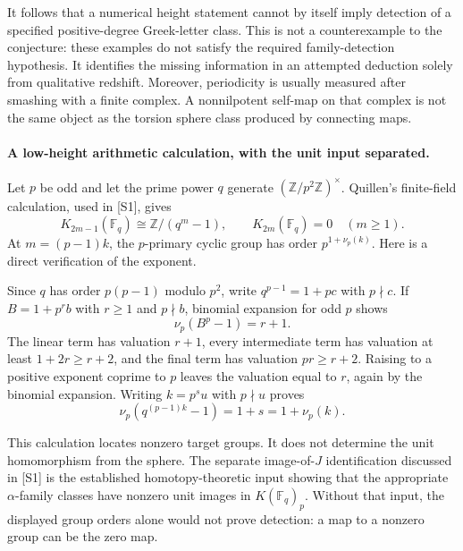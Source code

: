\documentclass[11pt]{article}
\begin{document}
It follows that a numerical height statement cannot by itself imply
detection of a specified positive-degree Greek-letter class. This is
not a counterexample to the conjecture: these examples do not satisfy
the required family-detection hypothesis. It identifies the missing
information in an attempted deduction solely from qualitative redshift.
Moreover, periodicity is usually measured after smashing with a finite
complex. A nonnilpotent self-map on that complex is not the same
object as the torsion sphere class produced by connecting maps.

\paragraph{A low-height arithmetic calculation, with the unit input separated.}
Let $p$ be odd and let the prime power $q$ generate
$(\mathbb Z/p^2\mathbb Z)^\times$. Quillen's finite-field calculation,
used in [S1], gives
\[
 K_{2m-1}(\mathbb F_q)\cong\mathbb Z/(q^m-1),\qquad
 K_{2m}(\mathbb F_q)=0\quad(m\geq1).
\]
At $m=(p-1)k$, the $p$-primary cyclic group has order
$p^{1+\nu_p(k)}$. Here is a direct verification of the exponent.

Since $q$ has order $p(p-1)$ modulo $p^2$, write
$q^{p-1}=1+pc$ with $p\nmid c$. If $B=1+p^rb$ with $r\geq1$
and $p\nmid b$, binomial expansion for odd $p$ shows
\[
 \nu_p(B^p-1)=r+1.
\]
The linear term has valuation $r+1$, every intermediate term has
valuation at least $1+2r\geq r+2$, and the final term has valuation
$pr\geq r+2$. Raising to a positive exponent coprime to $p$ leaves
the valuation equal to $r$, again by the binomial expansion.
Writing $k=p^su$ with $p\nmid u$ proves
\[
 \nu_p(q^{(p-1)k}-1)=1+s=1+\nu_p(k).
 \tag{453.2}
\]

This calculation locates nonzero target groups. It does not determine
the unit homomorphism from the sphere. The separate image-of-$J$
identification discussed in [S1] is the established homotopy-theoretic
input showing that the appropriate $\alpha$-family classes have
nonzero unit images in $K(\mathbb F_q)_p$. Without that input, the
displayed group orders alone would not prove detection: a map to a
nonzero group can be the zero map.
\end{document}
